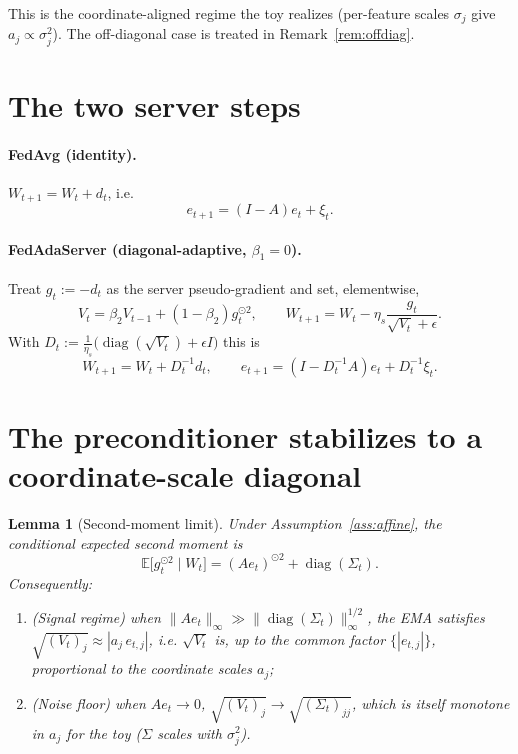 \documentclass[11pt]{article}
\newtheorem{lemma}{Lemma}
\theoremstyle{definition}
\DeclareMathOperator{\diag}{diag}
\newcommand{\E}{\mathbb{E}}
\begin{document}
\noindent This is the coordinate-aligned regime the toy realizes (per-feature
scales $\sigma_j$ give $a_j\propto\sigma_j^2$). The off-diagonal case is treated in
Remark~\ref{rem:offdiag}.

\section{The two server steps}

\paragraph{FedAvg (identity).} $W_{t+1}=W_t+d_t$, i.e.
\begin{equation}\label{eq:fedavg}
  e_{t+1}=(I-A)e_t+\xi_t.
\end{equation}

\paragraph{FedAdaServer (diagonal-adaptive, $\beta_1=0$).} Treat $g_t:=-d_t$ as the
server pseudo-gradient and set, elementwise,
\[
  V_t=\beta_2 V_{t-1}+(1-\beta_2)g_t^{\odot2},\qquad
  W_{t+1}=W_t-\eta_s\frac{g_t}{\sqrt{V_t}+\epsilon}.
\]
With $D_t:=\frac1{\eta_s}\big(\diag(\sqrt{V_t})+\epsilon I\big)$ this is
\begin{equation}\label{eq:ada}
  W_{t+1}=W_t+D_t^{-1}d_t,\qquad e_{t+1}=(I-D_t^{-1}A)e_t+D_t^{-1}\xi_t.
\end{equation}

\section{The preconditioner stabilizes to a coordinate-scale diagonal}

\begin{lemma}[Second-moment limit]\label{lem:V}
Under Assumption~\ref{ass:affine}, the conditional expected second moment is
\[
  \E\big[g_t^{\odot2}\mid W_t\big]=(Ae_t)^{\odot2}+\diag(\Sigma_t).
\]
Consequently:
\begin{enumerate}
\item (Signal regime) when $\|Ae_t\|_\infty\gg\|\diag(\Sigma_t)\|_\infty^{1/2}$, the EMA
satisfies $\sqrt{(V_t)_j}\approx |a_j\, e_{t,j}|$, i.e. $\sqrt{V_t}$ is, up to the
common factor $\{|e_{t,j}|\}$, proportional to the coordinate scales $a_j$;
\item (Noise floor) when $Ae_t\to0$, $\sqrt{(V_t)_j}\to\sqrt{(\Sigma_t)_{jj}}$, which
is itself monotone in $a_j$ for the toy ($\Sigma$ scales with $\sigma_j^2$).
\end{enumerate}
\end{lemma}
\end{document}
